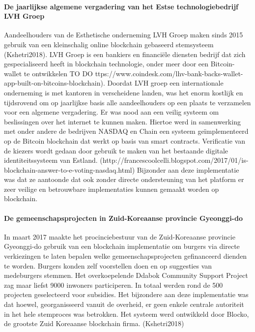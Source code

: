 				\paragraph{De jaarlijkse algemene vergadering van het Estse technologiebedrijf LVH Groep}
				Aandeelhouders van de Esthetische onderneming LVH Groep maken sinds 2015 gebruik van een kleinschalig online blockchain gebaseerd stemsysteem (Kshetri2018). LVH Groep is een bankiers en financiële diensten bedrijf dat zich gespecialiseerd heeft in blockchain technologie, onder meer door een Bitcoin-wallet te ontwikkelen TO DO ttps://www.coindesk.com/lhv-bank-backs-wallet-app-built-on-bitcoins-blockchain). Doordat LVH groep een internationale onderneming is met kantoren in verscheidene landen, was het enorm kostlijk en tijdsrovend om op jaarlijkse basis alle aandeelhouders op een plaats te verzamelen voor een algemene vergadering. Er was  nood aan een veilig systeem om beslissingen over het internet te kunnen maken. Hiertoe werd in samenwerking met onder andere de bedrijven NASDAQ en Chain een systeem geïmplementeerd op de Bitcoin blockchain dat werkt op basis van smart contracts. Verificatie van de kiezers wordt gedaan door gebruik te maken van het bestaande digitale identiteitssysteem van Estland. (http://francescoolcelli.blogspot.com/2017/01/is-blockchain-answer-to-e-voting-nasdaq.html) Bijzonder aan deze implementatie was dat ze aantoonde dat ook zonder directe ondersteuning van het platform er zeer veilige en betrouwbare implementaties kunnen gemaakt worden op blockchain.
				
				\paragraph{De gemeenschapsprojecten in Zuid-Koreaanse provincie Gyeonggi-do}
				In maart 2017 maakte het procinciebestuur van de Zuid-Koreaanse provincie Gyeonggi-do gebruik van een blockchain implementatie om burgers via directe verkiezingen te laten  bepalen welke gemeenschapsprojecten gefinanceerd dienden te worden. Burgers konden zelf voorstellen doen en op suggesties van medeburgers stemmen. Het overkoepelende Ddabok Community Support Project zag maar liefst 9000 inwoners participeren. In totaal werden rond de 500  projecten geselecteerd voor subsidies. Het bijzondere aan deze implementatie was dat hoewel, georganisseerd vanuit de overheid, er geen enkele centrale autoriteit in het hele stemproces was betrokken. Het systeem werd ontwikkeld door Blocko, de grootste Zuid Koreaanse blockchain firma. (Kshetri2018)
				
